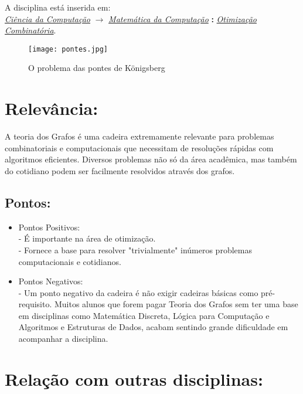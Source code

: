 \documentclass[10pt]{article}
\begin{document}
A disciplina está inserida em:\\
\underline{\emph{Ciência da Computação}} $\rightarrow$ \underline{\emph{Matemática da Computação}} \textbf{:} \underline{\emph{Otimização Combinatória}}.

\begin{figure}[h]
    \centering %
    \texttt{[image: pontes.jpg]}
    \caption{O problema das pontes de Königsberg}
    \label{fig:my_label}
\end{figure}

\section{Relevância:}
A teoria dos Grafos é uma cadeira extremamente relevante para problemas combinatoriais e computacionais que necessitam de resoluções rápidas com algoritmos eficientes. Diversos problemas não só da área acadêmica, mas também do cotidiano  podem ser facilmente resolvidos através dos grafos.
\subsection{Pontos:}
\begin{itemize}
    \item Pontos Positivos: \\
    - É importante na área de otimização.\\
    - Fornece a base para resolver "trivialmente" inúmeros problemas computacionais e cotidianos.
    \item Pontos Negativos:\\
    - Um ponto negativo da cadeira é não exigir cadeiras básicas como pré-requisito. Muitos alunos que forem pagar Teoria dos Grafos sem ter uma base em disciplinas como Matemática Discreta, Lógica para Computação e Algoritmos e Estruturas de Dados, acabam sentindo grande dificuldade em acompanhar a disciplina.
\end{itemize}


\section{Relação com outras disciplinas:}
\end{document}
